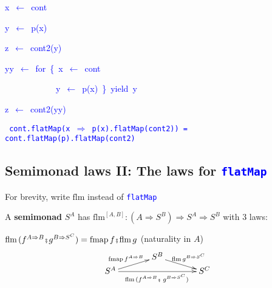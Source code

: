 \texttt{\textcolor{blue}{\footnotesize{}}}%
\begin{minipage}[c][1\totalheight][t]{0.49\columnwidth}%
\begin{lyxcode}
\textcolor{blue}{\footnotesize{}x~$\leftarrow$~cont}{\footnotesize\par}

\textcolor{blue}{\footnotesize{}y~$\leftarrow$~p(x)}{\footnotesize\par}

\textcolor{blue}{\footnotesize{}z~$\leftarrow$~cont2(y)}{\footnotesize\par}
\end{lyxcode}
%
\end{minipage}\texttt{\textcolor{blue}{\footnotesize{}\hfill{}}}%
\begin{minipage}[c][1\totalheight][t]{0.49\columnwidth}%
\begin{lyxcode}
\textcolor{blue}{\footnotesize{}yy~$\leftarrow$~for~\{~x~$\leftarrow$~cont}{\footnotesize\par}

\textcolor{blue}{\footnotesize{}~~~~~~~~~~~~y~$\leftarrow$~p(x)~\}~yield~y}{\footnotesize\par}

\textcolor{blue}{\footnotesize{}z~$\leftarrow$~cont2(yy)}{\footnotesize\par}
\end{lyxcode}
%
\end{minipage}\texttt{\textcolor{blue}{\footnotesize{}\hfill{}\medskip{}
cont.flatMap(x $\Rightarrow$ p(x).flatMap(cont2)) = cont.flatMap(p).flatMap(cont2)}} 


\subsection{Semimonad laws II: The laws for \texttt{\textcolor{blue}{\footnotesize{}flatMap}} }

For brevity, write {\footnotesize{}$\text{flm}$} instead of \texttt{\textcolor{blue}{\footnotesize{}flatMap}} 

A \textbf{semimonad} $S^{A}$ has {\footnotesize{}$\text{flm}^{\left[A,B\right]}:\left(A\Rightarrow S^{B}\right)\Rightarrow S^{A}\Rightarrow S^{B}$}
with 3 laws:

{\footnotesize{}$\text{flm}\,(f^{A\Rightarrow B}\bef g^{B\Rightarrow S^{C}})=\text{fmap}\,f\bef\text{flm}\,g$}
{\footnotesize{}(naturality in $A$)} {\footnotesize{}
\[
\xymatrix{\xyScaleY{0.2pc}\xyScaleX{3pc} & S^{B}\ar[rd]\sp(0.5){\ \text{flm}\,g^{B\Rightarrow S^{C}}}\\
S^{A}\ar[ru]\sp(0.5){\text{fmap}\,f^{A\Rightarrow B}\ }\ar[rr]\sb(0.5){\text{flm}\,(f^{A\Rightarrow B}\bef\,g^{B\Rightarrow S^{C}})\,} &  & S^{C}
}
\]
}{\footnotesize\par}

